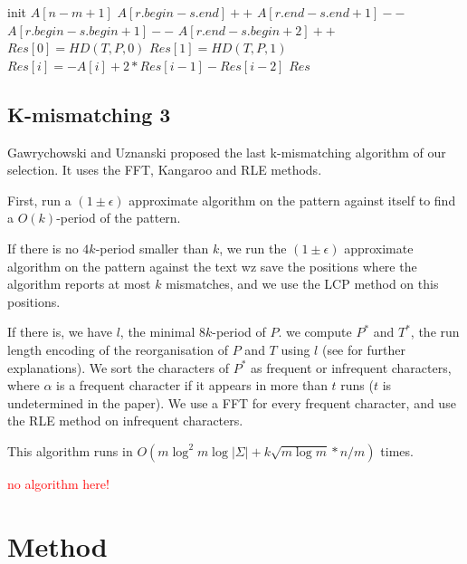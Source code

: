 \documentclass[preprint,12pt]{elsarticle}
\begin{document}
\begin{algorithm}
\label{RLEmet}
\caption{$K\_mism\_1(T, P, k)$}
\begin{algorithmic}

\STATE init $A[n-m+1]$
			\STATE $A[r.begin - s.end] ++$
			\STATE $A[r.end-s.end+1] --$
			\STATE $A[r.begin - s.begin+1]--$
			\STATE $A[r.end - s.begin +2] ++$
		\ENDIF
	\ENDFOR
\ENDFOR
\STATE $Res[0] = HD(T, P, 0)$
\STATE $Res[1] = HD(T, P, 1)$
	\STATE $Res[i] = -A[i] + 2 * Res[i-1] - Res[i-2]$
\ENDFOR
\RETURN $Res$

\end{algorithmic}
\end{algorithm}






\subsection{K-mismatching 3}
Gawrychowski and Uznanski\cite{Kmism3} proposed the last k-mismatching algorithm of our selection.
It uses the FFT, Kangaroo and RLE methods. 

First, run a $(1 \pm \epsilon)$ approximate algorithm on the pattern against itself
to find a $O(k)$-period of the pattern.

If there is no $4k$-period smaller than $k$,
we run the $(1 \pm \epsilon)$ approximate algorithm on the pattern against the text
wz save the positions where the algorithm reports at most $k$ mismatches,
and we use the LCP method on this positions. 

If there is, we have $l$, the minimal $8k$-period of $P$.
we compute $P^*$ and $T^*$, the run length encoding of the reorganisation of $P$ and $T$ using $l$
(see \cite{Kmism3} for further explanations).
We sort the characters of $P^*$ as frequent or infrequent characters,
where $\alpha$ is a frequent character if it appears in more than $t$ runs
($t$ is undetermined in the paper).
We use a FFT for every frequent character,
and use the RLE method on infrequent characters.

This algorithm runs in $O(m \log^2 m \log |\Sigma| +k \sqrt{m \log m} * n/m)$ times.


\textcolor{red}{no algorithm here!}

\section{Method}
\label{Method}
\end{document}
